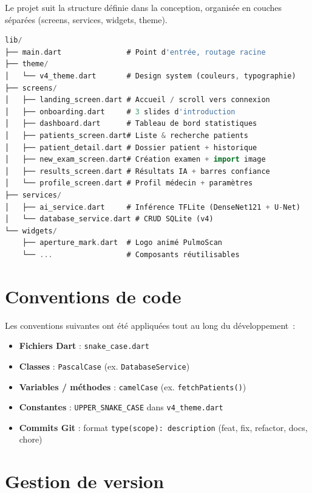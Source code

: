 \documentclass[12pt, a4paper]{report}
\begin{document}
Le projet suit la structure définie dans la conception, organisée en couches
séparées (screens, services, widgets, theme).

\begin{tcbox}[codebox, title={Structure des dossiers (lib/)}]
\begin{lstlisting}[language=Dart, numbers=none]
lib/
├── main.dart               # Point d'entrée, routage racine
├── theme/
│   └── v4_theme.dart       # Design system (couleurs, typographie)
├── screens/
│   ├── landing_screen.dart # Accueil / scroll vers connexion
│   ├── onboarding.dart     # 3 slides d'introduction
│   ├── dashboard.dart      # Tableau de bord statistiques
│   ├── patients_screen.dart# Liste & recherche patients
│   ├── patient_detail.dart # Dossier patient + historique
│   ├── new_exam_screen.dart# Création examen + import image
│   ├── results_screen.dart # Résultats IA + barres confiance
│   └── profile_screen.dart # Profil médecin + paramètres
├── services/
│   ├── ai_service.dart     # Inférence TFLite (DenseNet121 + U-Net)
│   └── database_service.dart # CRUD SQLite (v4)
└── widgets/
    ├── aperture_mark.dart  # Logo animé PulmoScan
    └── ...                 # Composants réutilisables
\end{lstlisting}
\end{tcbox}

\section{Conventions de code}

Les conventions suivantes ont été appliquées tout au long du développement~:
\begin{itemize}
  \item \textbf{Fichiers Dart} : \texttt{snake\_case.dart}
  \item \textbf{Classes} : \texttt{PascalCase} (ex. \texttt{DatabaseService})
  \item \textbf{Variables / méthodes} : \texttt{camelCase} (ex. \texttt{fetchPatients()})
  \item \textbf{Constantes} : \texttt{UPPER\_SNAKE\_CASE} dans \texttt{v4\_theme.dart}
  \item \textbf{Commits Git} : format \texttt{type(scope): description}
        (feat, fix, refactor, docs, chore)
\end{itemize}

\section{Gestion de version}
\end{document}
